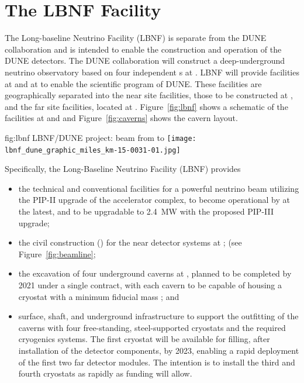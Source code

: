 \section{The LBNF Facility} %

The Long-baseline Neutrino
Facility (LBNF) is separate from the DUNE collaboration and is intended to enable the construction and operation of the DUNE detectors.
The DUNE collaboration will construct a deep-underground neutrino observatory based on four independent \nominalmodsize \lartpc{}s at \surf. %
LBNF will provide facilities at \fnal and at \surf to enable the scientific program of DUNE.
These facilities are geographically separated into the near site facilities, those to be constructed
at \fnal, and the far site facilities, located at \surf. Figure~\ref{fig:lbnf} shows
a schematic of the facilities at \fnal and \surf and Figure~\ref{fig:caverns} shows the cavern layout. 

\begin{dunefigure}{fig:lbnf}{ 	
LBNF/DUNE project: beam from \fnal to \surf}
\texttt{[image: lbnf\_dune\_graphic\_miles\_km-15-0031-01.jpg]}
\end{dunefigure}

Specifically, the Long-Baseline Neutrino Facility (LBNF) provides
\begin{itemize}

\item  the  technical and conventional facilities for a powerful  neutrino beam utilizing the PIP-II upgrade of the \fnal accelerator 
complex, to become operational by \beamturnon  
at the latest, and to be upgradable to \SI{2.4}{\MW} with the proposed 
PIP-III upgrade;

\item  the civil construction () for the near detector systems at \fnal; (see Figure~\ref{fig:beamline}; 

\item the excavation of four underground caverns at \surf, planned to be completed 
by 2021 
under a single contract, with each cavern to be capable of housing a cryostat with 
a minimum \nominalmodsize fiducial mass \lartpc; and



\item surface, shaft, and underground infrastructure to support 
the outfitting of the caverns with four free-standing, steel-supported cryostats 
and the required cryogenics systems. The first cryostat will be available for filling, after installation of the detector components, by
2023, enabling a rapid deployment of the first two \nominalmodsize far detector modules. 
The intention is to install the third and fourth cryostats as rapidly as funding will 
allow.

\end{itemize}

